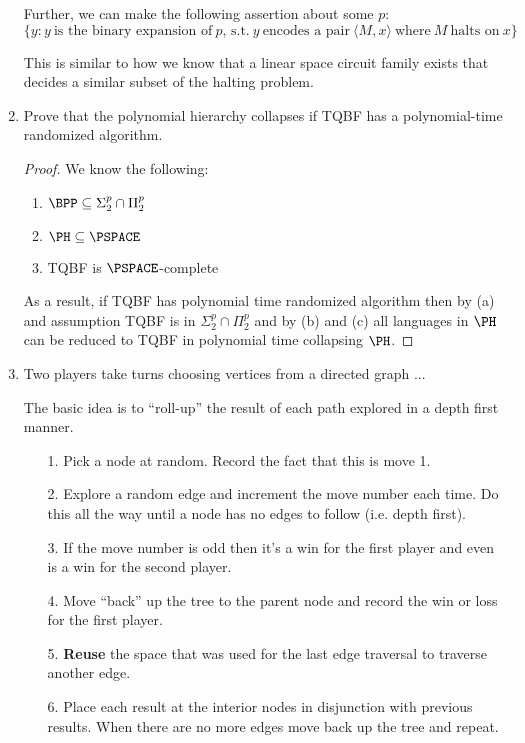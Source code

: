 \documentclass[usletter]{article}
\begin{document}
\begin{enumerate}
    Further, we can make the following assertion about some $p$:
    \begin{equation*}
      \{ y : y\ \text{is the binary expansion of}\ p\text{, s.t.}\ y\ \text{encodes a pair}\ \langle M, x \rangle\ \text{where}\ M\ \text{halts on}\ x \}
    \end{equation*}

    This is similar to how we know that a linear space circuit family exists that decides a similar subset of the halting problem.

  \item Prove that the polynomial hierarchy collapses if TQBF has a polynomial-time randomized algorithm.

    \begin{proof}
      We know the following:

      \begin{enumerate}
        \item $\BPP \subseteq \Sigma_{2}^{p} \cap \Pi_{2}^{p}$
        \item $\PH \subseteq \PSPACE$
        \item TQBF is $\PSPACE$-complete
      \end{enumerate}

      As a result, if TQBF has polynomial time randomized algorithm then by (a) and assumption TQBF is in $\Sigma_{2}^{p} \cap \Pi_{2}^{p}$ and by (b) and (c) all languages in $\PH$ can be reduced to TQBF in polynomial time collapsing $\PH$.
    \end{proof}

  \item Two players take turns choosing vertices from a directed graph ...

    The basic idea is to ``roll-up'' the result of each path explored in a depth first manner.

   \begin{itemize}
     \item[1.] Pick a node at random. Record the fact that this is move 1.
     \item[2.] Explore a random edge and increment the move number each time. Do this all the way until a node has no edges to follow (i.e. depth first).
     \item[3.] If the move number is odd then it's a win for the first player and even is a win for the second player.
     \item[4.] Move ``back'' up the tree to the parent node and record the win or loss for the first player.
     \item[5.] \textbf{Reuse} the space that was used for the last edge traversal to traverse another edge.
     \item[6.] Place each result at the interior nodes in disjunction with previous results. When there are no more edges move back up the tree and repeat.
   \end{itemize}


\end{enumerate}
\end{document}
